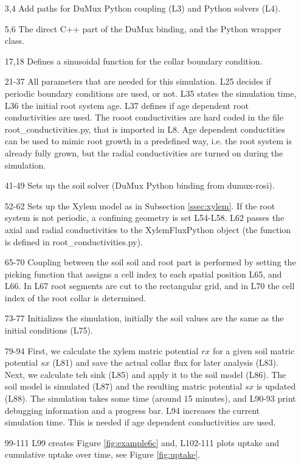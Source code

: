 \begin{itemize}

\item[3,4] Add paths for DuMux Python coupling (L3) and Python solvers (L4).

\item[5,6] The direct C++ part of the DuMux binding, and the Python wrapper class. 

\item[17,18]  Defines a sinusoidal function for the collar boundary condition.

\item[21-37] All parameters that are needed for this simulation. L25 decides if periodic boundary conditions are used, or not. L35 states the simulation time, L36 the initial root system age. L37 defines if age dependent root conductivities are used. The rooot conductivities are hard coded in the file root\_conductivities.py, that is imported in L8. Age dependent conductities can be used to mimic root growth in a predefined way, i.e. the root system is already fully grown, but the radial conductivities are turned on during the simulation. 

\item[41-49] Sets up the soil solver (DuMux Python binding from dumux-rosi). 

\item[52-62] Sets up the Xylem model as in Subsection \ref{ssec:xylem}. If the root system is not periodic, a confining geometry is set L54-L58. L62 passes the axial and radial conductivities to the XylemFluxPython object (the function is defined in root\_conductivities.py).

\item[65-70] Coupling between the soil soil and root part is performed by setting the picking function that assigns a cell index to each spatial position L65, and L66. In L67 root segments are cut to the rectangular grid, and in L70 the cell index of the root collar is determined. 

\item[73-77] Initializes the simulation, initially the soil values are the same as the initial conditions (L75).

\item[79-94] First, we calculate the xylem matric potential $rx$ for a given soil matric potential $sx$ (L81) and save the actual collar flux for later analysis (L83). Next, we calculate teh sink (L85) and apply it to the soil model (L86). The soil model is simulated (L87) and the resulting matric potential $sx$ is updated (L88). The simulation takes some time (around 15 minutes), and L90-93 print debugging information and a progress bar. L94 increases the current simulation time. This is needed if age dependent conductivities are used. 

\item[99-111] L99 creates Figure \ref{fig:example6c} and, L102-111 plots uptake and cumulative uptake over time, see Figure \ref{fig:uptake}.

\end{itemize}

